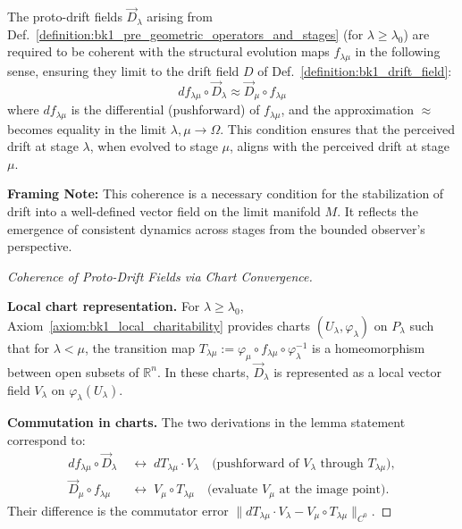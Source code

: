 \begin{lemma}
\label{lemma:bk1_coherence_of_proto_drift_fields}
The proto-drift fields $\vec{D}_\lambda$ arising from Def.~\ref{definition:bk1_pre_geometric_operators_and_stages} (for $\lambda \ge \lambda_0$) are required to be coherent with the structural evolution maps $f_{\lambda\mu}$ in the following sense, ensuring they limit to the drift field $D$ of Def.~\ref{definition:bk1_drift_field}:
\[
df_{\lambda\mu} \circ \vec{D}_\lambda \approx \vec{D}_\mu \circ f_{\lambda\mu}
\]
where $df_{\lambda\mu}$ is the differential (pushforward) of $f_{\lambda\mu}$, and the approximation $\approx$ becomes equality in the limit $\lambda, \mu \to \Omega$. This condition ensures that the perceived drift at stage $\lambda$, when evolved to stage $\mu$, aligns with the perceived drift at stage $\mu$.

\smallskip
\noindent
\textbf{Framing Note:} This coherence is a necessary condition for the stabilization of drift into a well-defined vector field on the limit manifold $M$. It reflects the emergence of consistent dynamics across stages from the bounded observer's perspective.

\begin{proof}[Coherence of Proto-Drift Fields via Chart Convergence]
\label{proof:bk1_sketch_coherence_drift_reflection}
\leavevmode

\textbf{Local chart representation.}
For $\lambda \geq \lambda_0$, Axiom~\ref{axiom:bk1_local_charitability} provides
charts $(U_\lambda, \varphi_\lambda)$ on $P_\lambda$ such that for $\lambda < \mu$,
the transition map $T_{\lambda\mu} := \varphi_\mu \circ f_{\lambda\mu} \circ \varphi_\lambda^{-1}$
is a homeomorphism between open subsets of $\mathbb{R}^n$.
In these charts, $\vec{D}_\lambda$ is represented as a local vector field
$V_\lambda$ on $\varphi_\lambda(U_\lambda)$.

\textbf{Commutation in charts.}
The two derivations in the lemma statement correspond to:
\begin{align*}
df_{\lambda\mu} \circ \vec{D}_\lambda &\;\longleftrightarrow\; dT_{\lambda\mu} \cdot V_\lambda
\quad\text{(pushforward of $V_\lambda$ through $T_{\lambda\mu}$)}, \\
\vec{D}_\mu \circ f_{\lambda\mu} &\;\longleftrightarrow\; V_\mu \circ T_{\lambda\mu}
\quad\text{(evaluate $V_\mu$ at the image point)}.
\end{align*}
Their difference is the commutator error
$\|dT_{\lambda\mu} \cdot V_\lambda - V_\mu \circ T_{\lambda\mu}\|_{C^0}$.


\end{proof}
\end{lemma}
